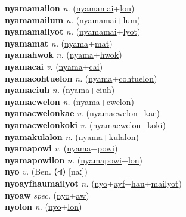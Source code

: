 \textbf{nyamamailon} \textit{n.} (\hyperref[nyamamai]{nyamamai}+\hyperref[lon]{lon})
 \label{nyamamailon} \\
\textbf{nyamamailum} \textit{n.} (\hyperref[nyamamai]{nyamamai}+\hyperref[lum]{lum})
 \label{nyamamailum} \\
\textbf{nyamamailyot} \textit{n.} (\hyperref[nyamamai]{nyamamai}+\hyperref[lyot]{lyot})
 \label{nyamamailyot} \\
\textbf{nyamamat} \textit{n.} (\hyperref[nyama]{nyama}+\hyperref[mat]{mat})
 \label{nyamamat} \\
\textbf{nyamahwok} \textit{n.} (\hyperref[nyama]{nyama}+\hyperref[hwok]{hwok})
 \label{nyamahwok} \\
\textbf{nyamacai} \textit{v.} (\hyperref[nyama]{nyama}+\hyperref[cai]{cai})
 \label{nyamacai} \\
\textbf{nyamacohtuelon} \textit{n.} (\hyperref[nyama]{nyama}+\hyperref[cohtuelon]{cohtuelon})
 \label{nyamacohtuelon} \\
\textbf{nyamaciuh} \textit{n.} (\hyperref[nyama]{nyama}+\hyperref[ciuh]{ciuh})
 \label{nyamaciuh} \\
\textbf{nyamacwelon} \textit{n.} (\hyperref[nyama]{nyama}+\hyperref[cwelon]{cwelon})
 \label{nyamacwelon} \\
\textbf{nyamacwelonkae} \textit{v.} (\hyperref[nyamacwelon]{nyamacwelon}+\hyperref[kae]{kae})
 \label{nyamacwelonkae} \\
\textbf{nyamacwelonkoki} \textit{v.} (\hyperref[nyamacwelon]{nyamacwelon}+\hyperref[koki]{koki})
 \label{nyamacwelonkoki} \\
\textbf{nyamakulalon} \textit{n.} (\hyperref[nyama]{nyama}+\hyperref[kulalon]{kulalon})
 \label{nyamakulalon} \\
\textbf{nyamapowi} \textit{v.} (\hyperref[nyama]{nyama}+\hyperref[powi]{powi})
 \label{nyamapowi} \\
\textbf{nyamapowilon} \textit{n.} (\hyperref[nyamapowi]{nyamapowi}+\hyperref[lon]{lon})
 \label{nyamapowilon} \\
\textbf{nyo} \textit{v.} (Ben. ⟨না⟩ [naː])
 \label{nyo} \\
\textbf{nyoayfhaumailyot} \textit{n.} (\hyperref[nyo]{nyo}+\hyperref[ayf]{ayf}+\hyperref[hau]{hau}+\hyperref[mailyot]{mailyot})
 \label{nyoayfhaumailyot} \\
\textbf{nyoaw} \textit{spec.} (\hyperref[nyo]{nyo}+\hyperref[aw]{aw})
 \label{nyoaw} \\
\textbf{nyolon} \textit{n.} (\hyperref[nyo]{nyo}+\hyperref[lon]{lon})
 \label{nyolon} \\
